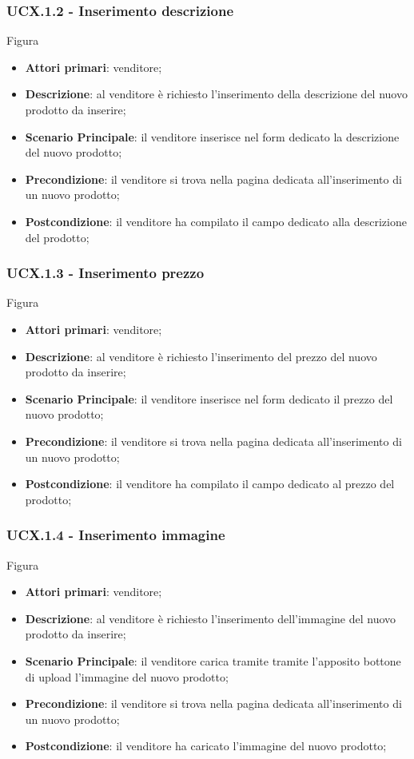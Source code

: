 \subsubsection{UCX.1.2 - Inserimento descrizione}
Figura \\
\begin{itemize}
\item \textbf{Attori primari}: venditore;
\item \textbf{Descrizione}: al venditore è richiesto l'inserimento della descrizione del nuovo prodotto da inserire;
\item \textbf{Scenario Principale}: il venditore inserisce nel form dedicato la descrizione del nuovo prodotto;
\item \textbf{Precondizione}: il venditore si trova nella pagina dedicata all'inserimento di un nuovo prodotto;
\item \textbf{Postcondizione}: il venditore ha compilato il campo dedicato alla descrizione del prodotto;
\end{itemize}

\subsubsection{UCX.1.3 - Inserimento prezzo}
Figura \\
\begin{itemize}
\item \textbf{Attori primari}: venditore;
\item \textbf{Descrizione}: al venditore è richiesto l'inserimento del prezzo del nuovo prodotto da inserire;
\item \textbf{Scenario Principale}: il venditore inserisce nel form dedicato il prezzo del nuovo prodotto;
\item \textbf{Precondizione}: il venditore si trova nella pagina dedicata all'inserimento di un nuovo prodotto;
\item \textbf{Postcondizione}: il venditore ha compilato il campo dedicato al prezzo del prodotto;
\end{itemize}

\subsubsection{UCX.1.4 - Inserimento immagine}
Figura \\
\begin{itemize}
\item \textbf{Attori primari}: venditore;
\item \textbf{Descrizione}: al venditore è richiesto l'inserimento dell'immagine del nuovo prodotto da inserire;
\item \textbf{Scenario Principale}: il venditore carica tramite tramite l'apposito bottone di upload l'immagine del nuovo prodotto;
\item \textbf{Precondizione}: il venditore si trova nella pagina dedicata all'inserimento di un nuovo prodotto;
\item \textbf{Postcondizione}: il venditore ha caricato l'immagine del nuovo prodotto;
\end{itemize}

